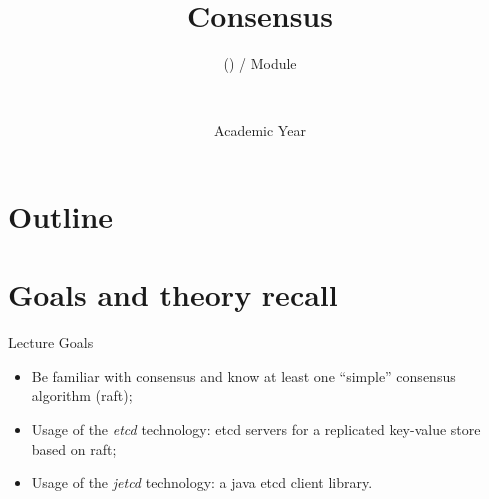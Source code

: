 \documentclass[presentation]{beamer}\mode<presentation>{\usetheme{AMSBolognaFC}}
\title[\currentLab{7} -- Consensus]{
	Consensus
}
\subtitle{\courseName{} (\courseAcronym) / Module \moduleN{}}
\author[\sspeaker{\mmShort} \& \gcShort]{
	\speaker{\mmFull} \and \gcFull
	\\ 
	\mmEmail \and \gcEmail
}
\institute[\disiShort, \uniboShort]{\disi{} (\disiShort)\\\unibo}
\date[A.Y. \academicYear{}]{Academic Year \academicYear{}}
\begin{document}

\frame{\titlepage}

\section*{Outline}
%
\frame[c]{\tableofcontents[hideallsubsections]}

\section{Goals and theory recall}

\begin{frame}{Lecture Goals}
	\begin{itemize}
		\item Be familiar with consensus and know at least one ``simple'' consensus algorithm (raft);
        \item Usage of the \emph{etcd} technology: etcd servers for a replicated key-value store based on raft;
        \item Usage of the \emph{jetcd} technology: a java etcd client library.
	\end{itemize}
\end{frame}
\end{document}
